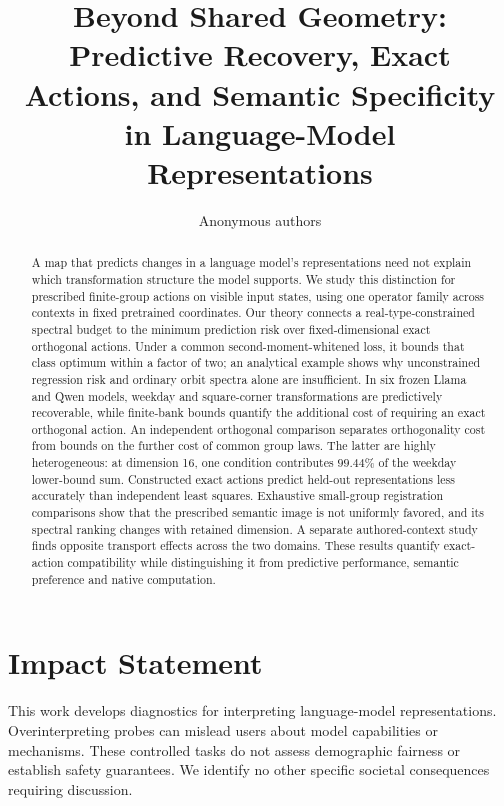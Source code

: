 \documentclass[10pt]{article}
\title{Beyond Shared Geometry: Predictive Recovery, Exact Actions, and Semantic Specificity in Language-Model Representations}
\author{Anonymous authors}
\begin{document}
\maketitle
\raggedbottom

\begin{abstract}
A map that predicts changes in a language model's representations need not explain which transformation structure the model supports. We study this distinction for prescribed finite-group actions on visible input states, using one operator family across contexts in fixed pretrained coordinates. Our theory connects a real-type-constrained spectral budget to the minimum prediction risk over fixed-dimensional exact orthogonal actions. Under a common second-moment-whitened loss, it bounds that class optimum within a factor of two; an analytical example shows why unconstrained regression risk and ordinary orbit spectra alone are insufficient. In six frozen Llama and Qwen models, weekday and square-corner transformations are predictively recoverable, while finite-bank bounds quantify the additional cost of requiring an exact orthogonal action. An independent orthogonal comparison separates orthogonality cost from bounds on the further cost of common group laws. The latter are highly heterogeneous: at dimension 16, one condition contributes $99.44\%$ of the weekday lower-bound sum. Constructed exact actions predict held-out representations less accurately than independent least squares. Exhaustive small-group registration comparisons show that the prescribed semantic image is not uniformly favored, and its spectral ranking changes with retained dimension. A separate authored-context study finds opposite transport effects across the two domains. These results quantify exact-action compatibility while distinguishing it from predictive performance, semantic preference and native computation.
\end{abstract}








\FloatBarrier
\label{sec:main-end}

\section*{Impact Statement}
This work develops diagnostics for interpreting language-model representations. Overinterpreting probes can mislead users about model capabilities or mechanisms. These controlled tasks do not assess demographic fairness or establish safety guarantees. We identify no other specific societal consequences requiring discussion.
\end{document}
